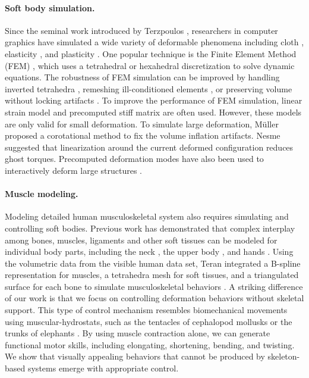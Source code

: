 \paragraph{Soft body simulation.} Since the seminal work introduced by Terzpoulos
\cite{Terzopoulos:1987}, researchers in computer graphics have
simulated a wide variety of deformable phenomena including cloth
\cite{Baraff:1998,Bridson:2002}, elasticity \cite{Muller:2002}, and
plasticity \cite{O'Brien:1999,Bargteil:2007}. One popular technique is
the Finite Element Method (FEM) \cite{Bathe:2007}, which uses a
tetrahedral or hexahedral discretization to solve dynamic
equations. The robustness of FEM simulation can be improved by
handling inverted tetrahedra \cite{Irving:2004}, remeshing
ill-conditioned elements \cite{Bargteil:2007}, or preserving volume
without locking artifacts \cite{Irving:2007}. To improve the
performance of FEM simulation, linear strain model and precomputed
stiff matrix are often used. However, these models are only valid for
small deformation. To simulate large deformation, M\"{u}ller \etal
\cite{Muller:2002} proposed a corotational method to fix the
volume inflation artifacts. Nesme \etal \cite{NPF05} suggested
that linearization around the current deformed configuration reduces
ghost torques. Precomputed deformation modes have also been used to
interactively deform large structures
\cite{James:2003,Barbic:2005,Kim:2009}.

\paragraph{Muscle modeling.} Modeling detailed human musculoskeletal system also requires
simulating and controlling soft bodies. Previous work has
demonstrated that complex interplay among bones, muscles, ligaments and
other soft tissues can be modeled for individual body parts, including
the neck \cite{Lee:2006}, the upper body
\cite{Zordan:2006,Dilorenzo:2008,Lee:2009:CBM}, and hands
\cite{Tsang:2005,Sueda:2008}. Using the volumetric data from the
visible human data set, Teran \etal integrated a B-spline
representation for muscles, a tetrahedra mesh for soft tissues, and a
triangulated surface for each bone to simulate musculoskeletal
behaviors \cite{Teran:2003,Teran:2005}. A striking difference of our
work is that we focus on controlling deformation behaviors without
skeletal support. This type of control mechanism resembles
biomechanical movements using muscular-hydrostats, such as the
tentacles of cephalopod mollusks or the trunks of elephants
\cite{Kier:1985}. By using muscle contraction alone, we can generate
functional motor skills, including elongating, shortening,
bending, and twisting. We show that visually appealing behaviors that
cannot be produced by skeleton-based systems emerge with
appropriate control.


